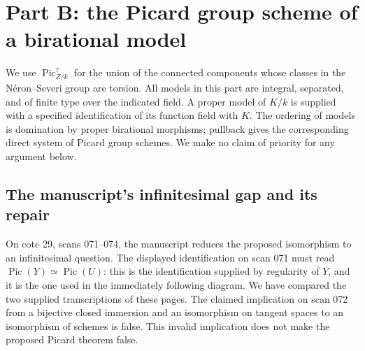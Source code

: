 \section{Part B: the Picard group scheme of a birational model}

We use $\operatorname{Pic}^{\tau}_{Z/k}$ for the union of the connected
components whose classes in the N\'eron--Severi group are torsion.  All
models in this part are integral, separated, and of finite type over the
indicated field.  A proper model of $K/k$ is supplied with a specified
identification of its function field with $K$.  The ordering of models
is domination by proper birational morphisms; pullback gives the
corresponding direct system of Picard group schemes.  We make no claim
of priority for any argument below.

\subsection{The manuscript's infinitesimal gap and its repair}

On cote 29, scans 071--074, the manuscript reduces the proposed
isomorphism to an infinitesimal question.  The displayed identification
on scan 071 must read $\operatorname{Pic}(Y)\simeq
\operatorname{Pic}(U)$: this is the identification supplied by regularity
of $Y$, and it is the one used in the immediately following diagram.
We have compared the two supplied transcriptions of these pages.
The claimed implication on scan 072 from a bijective closed immersion
and an isomorphism on tangent spaces to an isomorphism of schemes is
false.  This invalid implication does not make the proposed Picard
theorem false.

